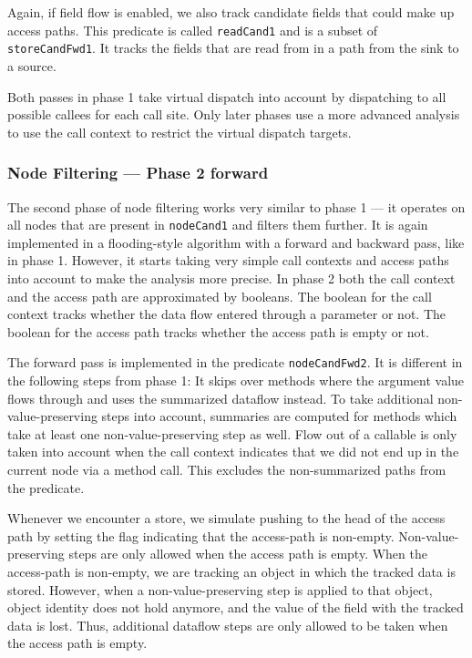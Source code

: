 Again, if field flow is enabled, we also track candidate fields that could make up 
access paths. This predicate is called \texttt{readCand1} and is a subset of 
\texttt{storeCandFwd1}.
It tracks the fields that are read from in a path from the sink to a source.

Both passes in phase 1 take virtual dispatch into account by dispatching to all possible callees
for each call site. Only later phases use a more advanced analysis to use the call context 
to restrict the virtual dispatch targets.

\subsubsection*{Node Filtering --- Phase 2 forward}
The second phase of node filtering works very similar to phase 1 --- it 
operates on all nodes that are present in \texttt{nodeCand1} and filters them further.
It is again implemented in a flooding-style algorithm with a forward and backward 
pass, like in phase 1.
However, it starts taking very simple call contexts and access paths 
into account to make the analysis more precise.
In phase 2 both the call context and the access path are approximated by booleans.
The boolean for the call context tracks whether the data flow entered through 
a parameter or not.
The boolean for the access path tracks whether the access path is empty or not.


The forward pass is implemented in the predicate \texttt{nodeCandFwd2}.
It is different in the following steps from phase 1:
It skips over methods where the argument value 
flows through and uses the summarized dataflow instead.
To take additional non-value-preserving steps into account,
summaries are computed for methods which take at least one
non-value-preserving step as well.
Flow out of a callable is only taken into account when the call context 
indicates that we did not end up in the current node via a method call.
This excludes the non-summarized paths from the predicate.

Whenever we encounter a store, we simulate pushing to the head of the access path 
by setting the flag indicating that the access-path is non-empty.
Non-value-preserving steps are only allowed when the access path is empty.
When the access-path is non-empty, we are tracking an object in which the tracked 
data is stored. However, when a non-value-preserving step is applied to that object,
object identity does not hold anymore, and the value of the field with the tracked
data is lost.
Thus, additional dataflow steps are only allowed to be taken when the access path 
is empty.

